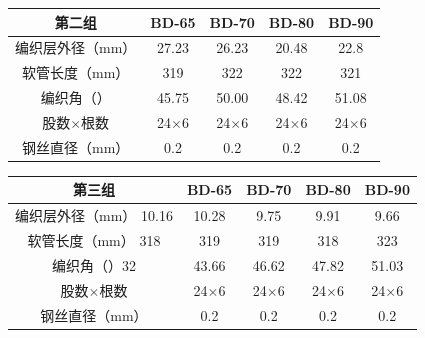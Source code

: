   \begin{table}[!htb]
  	\centering

  	\begin{tabular*}{0.8\textwidth}{@{\extracolsep{\fill}}>{\hspace{0.5cm}}ccccc}
  		\toprule
  		\textbf{第二组}          &     BD-65     &     BD-70     &     BD-80     &     BD-90     \\ \midrule
  		编织层外径（mm）  & 27.23      &     26.23     &     20.48     &     22.8        \\
  		软管长度（mm）    & 319       &      322      &      322      &      321        \\
  		编织角（\textdegree）& 45.75 &     50.00     &     48.42     &     51.08      \\
  		股数$ \times $根数        & 24$ \times $6 & 24$ \times $6 & 24$ \times $6 & 24$ \times $6 \\
  		钢丝直径（mm）              &      0.2      &      0.2      &      0.2      &      0.2      \\ \bottomrule
  	\end{tabular*} 
  \end{table}
  
  \begin{table}[!htb]
  	\centering
  	\begin{tabular*}{0.8\textwidth}{@{\extracolsep{\fill}}>{\hspace{0.5cm}}ccccc}
  		\toprule
  		\textbf{第三组}       &     BD-65     &     BD-70     &     BD-80     &     BD-90     \\ \midrule
  		编织层外径（mm）  10.16   &     10.28     &     9.75      &     9.91      &     9.66      \\
  		软管长度（mm）    318    &      319      &      319      &      318      &      323      \\
  		编织角（\textdegree）32 &     43.66     &     46.62     &     47.82     &     51.03     \\
  		股数$ \times $根数     & 24$ \times $6 & 24$ \times $6 & 24$ \times $6 & 24$ \times $6 \\
  		钢丝直径（mm）           &      0.2      &      0.2      &      0.2      &      0.2      \\ \bottomrule
  	\end{tabular*} 
  \end{table}  

